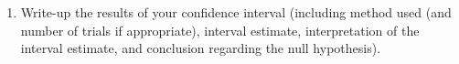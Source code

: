 \begin{enumerate}
\begin{enumerate}
\begin{enumerate}
\item Write-up the results of your confidence interval (including
  method 
  used (and number of trials if appropriate), interval estimate,
  interpretation of the interval estimate, and conclusion regarding
  the null hypothesis).
\begin{students}
          \vspace{2cm}
\end{students}
\begin{key}
 {\it  }      
\end{key}

    \end{enumerate}

  \end{enumerate}

\end{enumerate}


